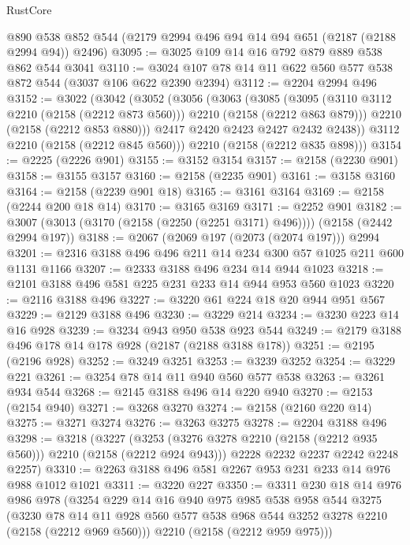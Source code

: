 \begin{lexlean}{RustCore}
\begin{coremodule}
    @890
    @538
    @852
    @544
    (@2179 @2994 @496 @94 @14 @94 @651 (@2187 (@2188 @2994 @94)) @2496)
@3095 := @3025 @109 @14 @16 @792 @879 @889 @538 @862 @544 @3041
@3110 := @3024 @107 @78 @14 @11 @622 @560 @577 @538 @872 @544 (@3037 @106 @622 @2390 @2394)
@3112 := @2204 @2994 @496
@3152 := @3022
    (@3042
      (@3052
        (@3056
          (@3063
            (@3085
              (@3095 (@3110 @3112 @2210 (@2158 (@2212 @873 @560))) @2210 (@2158 (@2212 @863 @879)))
              @2210
              (@2158 (@2212 @853 @880)))
            @2417
            @2420
            @2423
            @2427
            @2432
            @2438))
        @3112
        @2210
        (@2158 (@2212 @845 @560)))
      @2210
      (@2158 (@2212 @835 @898)))
@3154 := @2225 (@2226 @901)
@3155 := @3152 @3154
@3157 := @2158 (@2230 @901)
@3158 := @3155 @3157
@3160 := @2158 (@2235 @901)
@3161 := @3158 @3160
@3164 := @2158 (@2239 @901 @18)
@3165 := @3161 @3164
@3169 := @2158 (@2244 @200 @18 @14)
@3170 := @3165 @3169
@3171 := @2252 @901
@3182 := @3007 (@3013 (@3170 (@2158 (@2250 (@2251 @3171) @496)))) (@2158 (@2442 @2994 @197))
@3188 := @2067 (@2069 @197 (@2073 (@2074 @197))) @2994
@3201 := @2316 @3188 @496 @496 @211 @14 @234 @300 @57 @1025 @211 @600 @1131 @1166
@3207 := @2333 @3188 @496 @234 @14 @944 @1023
@3218 := @2101 @3188 @496 @581 @225 @231 @233 @14 @944 @953 @560 @1023
@3220 := @2116 @3188 @496
@3227 := @3220 @61 @224 @18 @20 @944 @951 @567
@3229 := @2129 @3188 @496
@3230 := @3229 @214
@3234 := @3230 @223 @14 @16 @928
@3239 := @3234 @943 @950 @538 @923 @544
@3249 := @2179 @3188 @496 @178 @14 @178 @928 (@2187 (@2188 @3188 @178))
@3251 := @2195 (@2196 @928)
@3252 := @3249 @3251
@3253 := @3239 @3252
@3254 := @3229 @221
@3261 := @3254 @78 @14 @11 @940 @560 @577 @538
@3263 := @3261 @934 @544
@3268 := @2145 @3188 @496 @14 @220 @940
@3270 := @2153 (@2154 @940)
@3271 := @3268 @3270
@3274 := @2158 (@2160 @220 @14)
@3275 := @3271 @3274
@3276 := @3263 @3275
@3278 := @2204 @3188 @496
@3298 := @3218
    (@3227
      (@3253 (@3276 @3278 @2210 (@2158 (@2212 @935 @560))) @2210 (@2158 (@2212 @924 @943)))
      @2228
      @2232
      @2237
      @2242
      @2248
      @2257)
@3310 := @2263 @3188 @496 @581 @2267 @953 @231 @233 @14 @976 @988 @1012 @1021
@3311 := @3220 @227
@3350 := @3311
    @230
    @18
    @14
    @976
    @986
    @978
    (@3254
      @229
      @14
      @16
      @940
      @975
      @985
      @538
      @958
      @544
      @3275
      (@3230 @78 @14 @11 @928 @560 @577 @538 @968 @544 @3252 @3278 @2210 (@2158 (@2212 @969 @560)))
      @2210
      (@2158 (@2212 @959 @975)))

\end{coremodule}
\end{lexlean}

